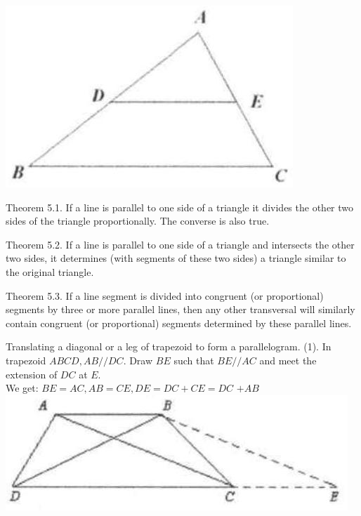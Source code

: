 \documentclass[10pt]{article}
\begin{document}
\begin{center}
\includegraphics[max width=\textwidth]{2025_04_17_97bc1f7e44d93c271a88g-101(1)}
\end{center}

Theorem 5.1. If a line is parallel to one side of a triangle it divides the other two sides of the triangle proportionally. The converse is also true.

Theorem 5.2. If a line is parallel to one side of a triangle and intersects the other two sides, it determines (with segments of these two sides) a triangle similar to the original triangle.

Theorem 5.3. If a line segment is divided into congruent (or proportional) segments by three or more parallel lines, then any other transversal will similarly contain congruent (or proportional) segments determined by these parallel lines.

Translating a diagonal or a leg of trapezoid to form a parallelogram.
(1). In trapezoid \(A B C D, A B / / D C\). Draw \(B E\) such that \(B E / / A C\) and meet the extension of \(D C\) at \(E\).\\
We get: \(B E=A C, A B=C E, D E=D C+C E=D C\) \(+A B\)\\
\includegraphics[max width=\textwidth, center]{2025_04_17_97bc1f7e44d93c271a88g-101}
\end{document}
